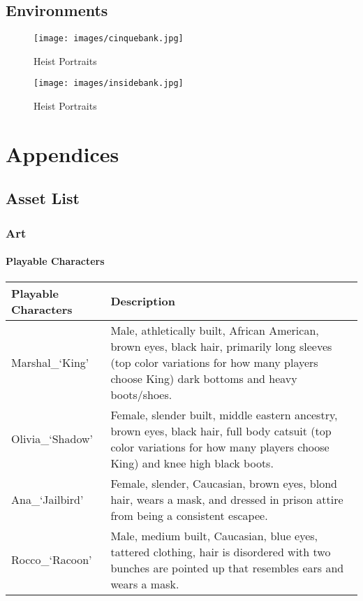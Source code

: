 \documentclass[14pt]{report}
\begin{document}
\section{Environments}

\begin{figure}[H]
	\texttt{[image: images/cinquebank.jpg]}
    \caption{Heist Portraits}
\end{figure}

\begin{figure}[H]
	\texttt{[image: images/insidebank.jpg]}
    \caption{Heist Portraits}
\end{figure}


\chapter{Appendices}

\section{Asset List}

\subsection{Art}

\subsubsection{Playable Characters}


\begin{tabular}{| p{.4\linewidth} | p{.4\linewidth}|} 
    \hline
    Playable Characters & Description \\ \hline
    Marshal\_`King'  &   Male, athletically built, African American, brown eyes, black hair, primarily long sleeves (top color variations for how many players choose King) dark bottoms and heavy boots/shoes.  \\ \hline
    Olivia\_`Shadow' &   Female, slender built, middle eastern ancestry, brown eyes, black hair, full body catsuit (top color variations for how many players choose King) and knee high black boots.  \\ \hline
    Ana\_`Jailbird'  &   Female, slender, Caucasian, brown eyes, blond hair, wears a mask, and dressed in prison attire from being a consistent escapee.  \\ \hline
    Rocco\_`Racoon'  &   Male, medium built, Caucasian, blue eyes, tattered clothing, hair is disordered with two bunches are pointed up that resembles ears and wears a mask.  \\
    \hline
\end{tabular}
\end{document}
